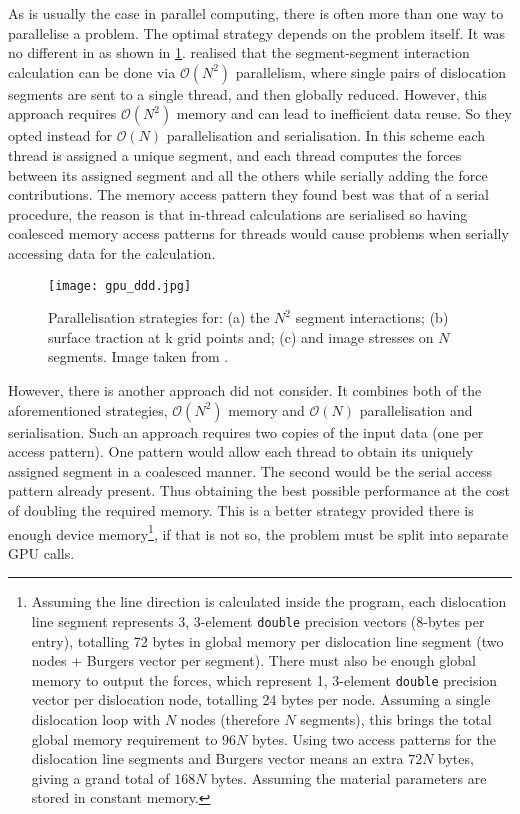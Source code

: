 As is usually the case in parallel computing, there is often more than one way to parallelise a problem. The optimal strategy depends on the problem itself. It was no different in \cite{gpu_ddd} as shown in \cref{f:gpu_ddd}.  realised that the segment-segment interaction calculation can be done via $ \mathcal{O}(N^{2}) $ parallelism, where single pairs of dislocation segments are sent to a single thread, and then globally reduced. However, this approach requires $ \mathcal{O}(N^{2}) $ memory and can lead to inefficient data reuse. So they opted instead for $ \mathcal{O}(N) $ parallelisation and serialisation. In this scheme each thread is assigned a unique segment, and each thread computes the forces between its assigned segment and all the others while serially adding the force contributions. The memory access pattern they found best was that of a serial procedure, the reason is that in-thread calculations are serialised so having coalesced memory access patterns for threads would cause problems when serially accessing data for the calculation.
\begin{figure}[t]
    \centering
    \texttt{[image: gpu\_ddd.jpg]}
    \caption[Parallelisation strategies for three problems in 3D DDD.]{Parallelisation strategies for: (a) the $ N^{2} $ segment interactions; (b) surface traction at k grid points and; (c) and image stresses on $ N $ segments. Image taken from \cite{gpu_ddd}.}
    \label{f:gpu_ddd}
\end{figure}

However, there is another approach \citet{gpu_ddd} did not consider. It combines both of the aforementioned strategies, $ \mathcal{O}(N^{2}) $ memory and $ \mathcal{O}(N) $ parallelisation and serialisation. Such an approach requires two copies of the input data (one per access pattern). One pattern would allow each thread to obtain its uniquely assigned segment in a coalesced manner. The second would be the serial access pattern already present. Thus obtaining the best possible performance at the cost of doubling the required memory. This is a better strategy provided there is enough device memory\footnote{Assuming the line direction is calculated inside the program, each dislocation line segment represents 3, 3-element \texttt{double} precision vectors (8-bytes per entry), totalling 72 bytes in global memory per dislocation line segment (two nodes + Burgers vector per segment). There must also be enough global memory to output the forces, which represent 1, 3-element \texttt{double} precision vector per dislocation node, totalling 24 bytes per node. Assuming a single dislocation loop with $ N $ nodes (therefore $ N $ segments), this brings the total global memory requirement to $ 96N $ bytes. Using two access patterns for the dislocation line segments and Burgers vector means an extra $ 72N $ bytes, giving a grand total of $ 168N $ bytes. Assuming the material parameters are stored in constant memory.}, if that is not so, the problem must be split into separate GPU calls.

